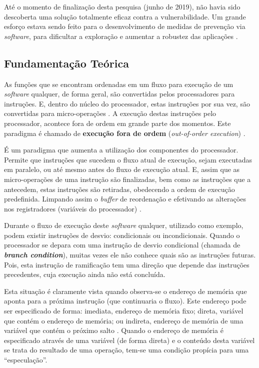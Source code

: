 \documentclass[
	article,			    %
	12pt,				    %
	oneside,			    %
	a4paper,			    %
	chapter=TITLE,		    %
	section=TITLE,		    %
	subsection=TITLE,	    %
	english,			    %
	brazil,				    %
	sumario=tradicional
]{abntex2}
\begin{document}
Até o momento de finalização desta pesquisa (junho de 2019), não havia sido descoberta uma solução totalmente eficaz contra a vulnerabilidade. Um grande esforço estava sendo feito para o desenvolvimento de medidas de prevenção via \emph{software}, para dificultar a exploração e aumentar a robustez das aplicações \cite{Graz2018Meltdown}.

\subsection{Fundamentação Teórica}
As funções que se encontram ordenadas em um fluxo para execução de um \emph{software} qualquer, de forma geral, são convertidas pelos processadores para instruções. E, dentro do núcleo do processador, estas instruções por sua vez, são convertidas para micro-operações \cite{Alisson2017Introducao}. A execução destas instruções pelo processador, acontece fora de ordem em grande parte dos momentos. Este paradigma é chamado de \textbf{execução fora de ordem} (\emph{out-of-order execution}) \cite{Fog2017Microarchitecture}.

É um paradigma que aumenta a utilização dos componentes do processador. Permite que instruções que sucedem o fluxo atual de execução, sejam executadas em paralelo, ou até mesmo antes do fluxo de execução atual. E, assim que as micro-operações de uma instrução são finalizadas, bem como as instruções que a antecedem, estas instruções são retiradas, obedecendo a ordem de execução predefinida. Limpando assim o \emph{buffer} de reordenação e efetivando as alterações nos registradores (variáveis do processador) \cite{Kocher2018Spectre}.

Durante o fluxo de execução deste \emph{software} qualquer, utilizado como exemplo, podem existir instruções de desvio: condicionais ou incondicionais. Quando o processador se depara com uma instrução de desvio condicional (chamada de \textbf{\emph{branch condition}}), muitas vezes ele não conhece quais são as instruções futuras. Pois, esta instrução de ramificação tem uma direção que depende das instruções precedentes, cuja execução ainda não está concluída. 

Esta situação é claramente vista quando observa-se o endereço de memória que aponta para a próxima instrução (que continuaria o fluxo). Este endereço pode ser especificado de forma: imediata, endereço de memória fixo; direta, variável que contém o endereço de memória; ou indireta, endereço de memória de uma variável que contém o próximo salto \cite{Debarshi2018Addressing}. Quando o endereço de memória é especificado através de uma variável (de forma direta) e o conteúdo desta variável se trata do resultado de uma operação, tem-se uma condição propícia para uma ``especulação''.
\end{document}
